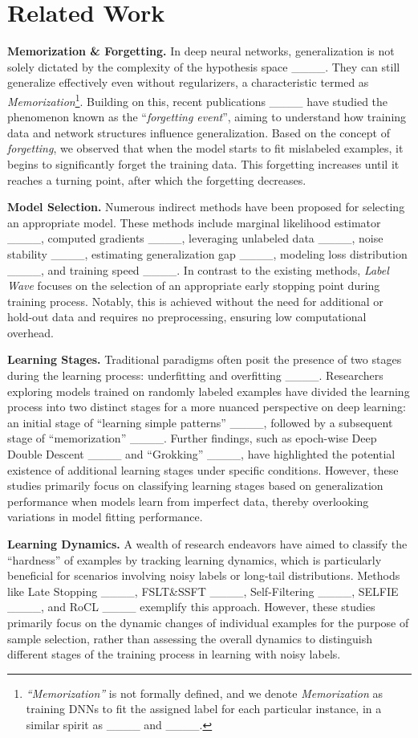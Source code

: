\section{Related Work}
\label{gen_inst}
\textbf{Memorization \& Forgetting.}
In deep neural networks, generalization is not solely dictated by the complexity of the hypothesis space ____. They can still generalize effectively even without regularizers, a characteristic termed as \emph{Memorization}\footnote{\emph{``Memorization''} is not formally defined, and we denote \emph{Memorization} as training DNNs to fit the assigned label for each particular instance, in a similar spirit as ____ and ____.}. 
Building on this, recent publications ____ have studied the phenomenon known as the ``\emph{forgetting event}'', aiming to understand how training data and network structures influence generalization. Based on the concept of \emph{forgetting}, we observed that when the model starts to fit mislabeled examples, it begins to significantly forget the training data. This forgetting increases until it reaches a turning point, after which the forgetting decreases.


\textbf{Model Selection.}
Numerous indirect methods have been proposed for selecting an appropriate model. These methods include marginal likelihood estimator ____, computed gradients ____,  leveraging unlabeled data ____, noise stability ____, estimating generalization gap ____, modeling loss distribution ____, and training speed ____.
In contrast to the existing methods, \emph{Label Wave} focuses on the selection of an appropriate early stopping point during training process. Notably, this is achieved without the need for additional or hold-out data and requires no preprocessing, ensuring low computational overhead.

\textbf{Learning Stages.}
Traditional paradigms often posit the presence of two stages during the learning process: underfitting and overfitting ____. Researchers exploring models trained on randomly labeled examples have divided the learning process into two distinct stages for a more nuanced perspective on deep learning: an initial stage of ``learning simple patterns'' ____, followed by a subsequent stage of ``memorization'' ____. Further findings, such as epoch-wise Deep Double Descent ____ and ``Grokking'' ____, have highlighted the potential existence of additional learning stages under specific conditions. However, these studies primarily focus on classifying learning stages based on generalization performance when models learn from imperfect data, thereby overlooking variations in model fitting performance.

\textbf{Learning Dynamics.}
A wealth of research endeavors have aimed to classify the ``hardness'' of examples by tracking learning dynamics, which is particularly beneficial for scenarios involving noisy labels or long-tail distributions. Methods like Late Stopping ____, FSLT\&SSFT ____, Self-Filtering ____, SELFIE ____, and RoCL ____ exemplify this approach. 
However, these studies primarily focus on the dynamic changes of individual examples for the purpose of sample selection, rather than assessing the overall dynamics to distinguish different stages of the training process in learning with noisy labels.

\clearpage